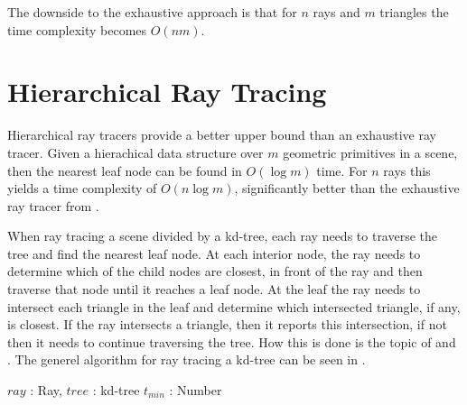 The downside to the exhaustive approach is that for $n$ rays and $m$
triangles the time complexity becomes $O(nm)$.

\section{Hierarchical Ray Tracing}\label{sec:hierarchicalTraversal}


Hierarchical ray tracers provide a better upper bound than an
exhaustive ray tracer. Given a hierachical data structure over $m$
geometric primitives in a scene, then the nearest leaf node can be
found in $O(\log m)$ time. For $n$ rays this yields a time complexity
of $O(n \log m)$, significantly better than the exhaustive ray tracer
from .


When ray tracing a scene divided by a kd-tree, each ray needs to
traverse the tree and find the nearest leaf node. At each interior
node, the ray needs to determine which of the child nodes are closest,
in front of the ray and then traverse that node until it reaches a
leaf node. At the leaf the ray needs to intersect each triangle in the
leaf and determine which intersected triangle, if any, is closest. If
the ray intersects a triangle, then it reports this intersection, if
not then it needs to continue traversing the tree. How this is done is
the topic of  and
. The generel algorithm for ray tracing a
kd-tree can be seen in .

\begin{algorithm}
  \caption{A generel kd-tree ray tracing algorithm}
  \label{alg:generelTracing}
  \begin{algorithmic}
              {$ray$ : Ray, $tree$ : kd-tree}
              {$t_{min}$ : Number}{
                  \ELSE
                  \ENDIF
                \ENDWHILE
              }
  \end{algorithmic}
\end{algorithm}

